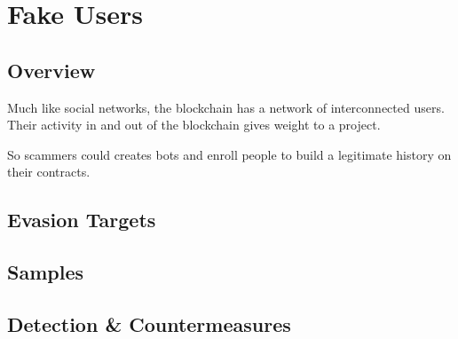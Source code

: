 \section{Fake Users} \label{sec:fake-users}

\subsection{Overview}

Much like social networks, the blockchain has a network of interconnected users.
Their activity in and out of the blockchain gives weight to a project.

So scammers could creates bots and enroll people to build a legitimate history on their contracts.

\subsection{Evasion Targets}

\subsection{Samples}

\subsection{Detection \& Countermeasures}
